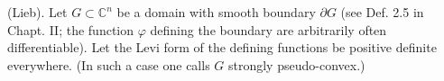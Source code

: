 (Lieb). Let $G \subset \mathbb{C}^n$ be a domain with smooth boundary $\partial G$ (see Def. 2.5 in Chapt. II; the function $\varphi$ defining the boundary are arbitrarily often differentiable). Let the Levi form of the defining functions be positive definite everywhere. (In such a case one calls $G$ strongly pseudo-convex.)
